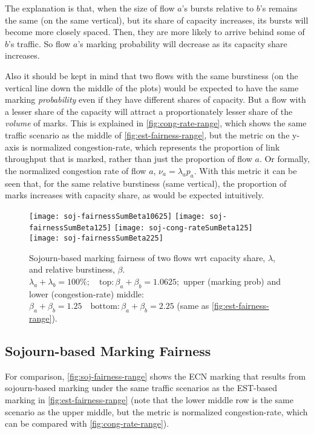 The explanation is that, when the size of flow \(a\)'s bursts relative to \(b\)'s remains the same (on the same vertical), but its share of capacity increases, its bursts will become more closely spaced. Then, they are more likely to arrive behind some of \(b\)'s traffic. So flow \(a\)'s marking probability will decrease as its capacity share increases.

Also it should be kept in mind that two flows with the same burstiness (on the vertical line down the middle of the plots) would be expected to have the same marking \emph{probability} even if they have different shares of capacity. But a flow with a lesser share of the capacity will attract a proportionately lesser share of the \emph{volume} of marks. This is explained in \autoref{fig:cong-rate-range}, which shows the same traffic scenario as the middle of \autoref{fig:est-fairness-range}, but the metric on the y-axis is normalized congestion-rate, which represents the proportion of link throughput that is marked, rather than just the proportion of flow \(a\). Or formally, the normalized congestion rate of flow \(a\), \(\nu_a = \lambda_a p_a\). With this metric it can be seen that, for the same relative burstiness (same vertical), the proportion of marks increases with capacity share, as would be expected intuitively.

\begin{figure*}
	\centering
	\texttt{[image: soj-fairnessSumBeta10625]}
	\texttt{[image: soj-fairnessSumBeta125]}
	\texttt{[image: soj-cong-rateSumBeta125]}
	\texttt{[image: soj-fairnessSumBeta225]}
	\caption{Sojourn-based marking fairness of two flows wrt capacity share, \(\lambda\), and relative burstiness, \(\beta\).\\
		\(\lambda_a+\lambda_b=100\%; \quad\mathrm{top:} \beta_a+\beta_b=1.0625;\) upper (marking prob) and lower (congestion-rate) middle: \(\beta_a+\beta_b=1.25 
		\quad\mathrm{bottom:} \beta_a+\beta_b=2.25\) (same as \autoref{fig:est-fairness-range}). 
}\label{fig:soj-fairness-range}
\end{figure*}

\subsection{Sojourn-based Marking Fairness}\label{sec:marking_fairness_expts_soj}

For comparison, \autoref{fig:soj-fairness-range} shows the ECN marking that results from sojourn-based marking under the same traffic scenarios as the EST-based marking in \autoref{fig:est-fairness-range} (note that the lower middle row is the same scenario as the upper middle, but the metric is normalized congestion-rate, which can be compared with \autoref{fig:cong-rate-range}).

